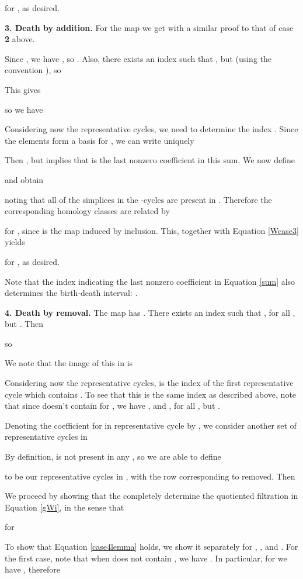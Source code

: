 \documentclass[12pt]{article}
\begin{document}
for , as desired.

\textbf{3. Death by addition.} For the map  we get  with a similar proof to that of case \textbf{2} above.

Since , we have , so . Also, there exists an index  such that , but  (using the convention ), so

This gives

so we have


Considering now the representative cycles, we need to determine the index . Since the elements  form a basis for , we can write uniquely

Then , but  implies that  is the last nonzero coefficient in this sum. We now define

and obtain

noting that all of the simplices in the -cycles  are present in . Therefore the corresponding homology classes are related by

for , since  is the map induced by inclusion. This, together with Equation \ref{Wcase3} yields

for , as desired.

Note that the index  indicating the last nonzero coefficient in Equation \ref{sum} also determines the birth-death interval: .

\textbf{4. Death by removal.} The map  has . There exists an index  such that , for all , but . Then

so

We note that the image of this in  is


Considering now the representative cycles,  is the index of the first representative cycle  which contains . To see that this is the same index  as described above, note that since  doesn't contain  for , we have , and , for all , but .

Denoting the coefficient for  in representative cycle  by , we consider another set of representative cycles in 

By definition,  is not present in any , so we are able to define

to be our representative cycles in , with the row corresponding to  removed. Then


We proceed by showing that the  completely determine the quotiented filtration  in Equation \ref{gWi}, in the sense that

for 



To show that Equation \ref{case4lemma} holds, we show it separately for , , and . For the first case, note that when  does not contain , we have . In particular, for  we have , therefore
\end{document}
